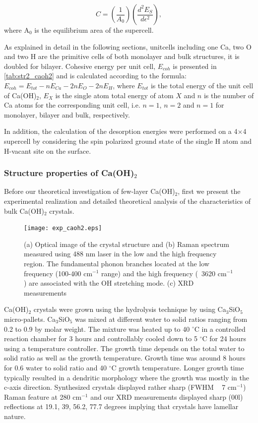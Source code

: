 \begin{equation}
 C = (\dfrac{1}{A_{0}})(\dfrac{d^{2}E_{S}}{d\epsilon^{2}}),
\end{equation}
where A$_{0}$ is the equilibrium area of the supercell.

As explained in detail in the following sections, unitcells including one Ca,
two O and two H are the primitive cells of both monolayer and bulk structures, 
it is doubled for bilayer. Cohesive energy per unit cell,
$E_{coh}$ is presented in \autoref{tab:str2_caoh2} and is calculated according to the formula:
$E_{coh}=E_{tot}-nE_{Ca}-2nE_O-2nE_H$, where $E_{tot}$ is the total energy
of the unit cell of Ca(OH)$_2$, $E_X$ is the single atom total energy of atom $X$
and $n$ is the number of Ca atoms for the corresponding unit cell, i.e.
$n=1$, $n=2$ and $n=1$ for monolayer, bilayer and bulk, respectively. 

In addition, the calculation of the desorption energies were performed on a 
4$\times$4 supercell by considering the spin polarized ground state of the 
single H atom and H-vacant site on the surface.





\subsubsection{Structure properties of C\lowercase{a}(OH)$_{2}$}\label{strcuture}


Before our theoretical investigation of few-layer Ca(OH)$_{2}$, first we 
present the experimental realization and detailed theoretical analysis of the
characteristics of bulk Ca(OH)$_{2}$ crystals.


\begin{figure}[htbp]
\centering
\texttt{[image: exp\_caoh2.eps]}
\caption{\label{fig:exp_caoh2} (a) Optical image of the crystal structure and (b) Raman 
spectrum measured using 488 nm laser in the low and the high frequency region. 
The fundamental phonon branches located at the low frequency (100-400 cm$^{-1}$  range) and the high frequency (~3620 cm$^{-1}$) are associated with the OH  stretching mode. (c) XRD measurements}
\end{figure}

Ca(OH)$_{2}$ crystals were grown using the hydrolysis technique by using 
Ca$_{3}$SiO$_{5}$ micro-pallets. Ca$_{3}$SiO$_{5}$ was mixed at different water 
to solid ratios ranging from 0.2 to 0.9 by molar weight. The mixture was heated 
up to 40 $^{\circ}\mathrm{C}$ in a controlled reaction chamber for 3 hours and 
controllably cooled down to 5 $^{\circ}\mathrm{C}$ for 24 hours using a
temperature controller. The growth time depends on the total water to solid 
ratio as well as the growth temperature. Growth time was around 8 hours for 0.6 
water to solid ratio and 40 $^{\circ}\mathrm{C}$ growth temperature. 
Longer growth time typically resulted in a dendritic morphology where the 
growth was mostly in the c-axis direction. Synthesized crystals displayed rather sharp (FWHM ~ 7 cm$^{-1}$) Raman feature at 280 cm$^{-1}$ and our XRD measurements displayed sharp (00l) reflections at 19.1, 39, 56.2, 77.7 degrees implying that crystals have lamellar nature.  
 

